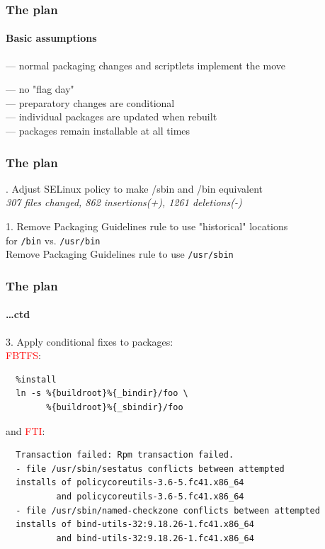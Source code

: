 \documentclass[]{beamer}
\begin{document}
\begin{frame}
  \frametitle{The plan}
  \framesubtitle{Basic assumptions}

  \pause
  — normal packaging changes and scriptlets implement the move
  \\\pause

  — no "flag day"
  \\\pause
  \phantom{—} — preparatory changes are conditional%
  \\\pause
  \phantom{—} — individual packages are updated when rebuilt
  \\\pause
  \phantom{—} — packages remain installable at all times
\end{frame}

\begin{frame}[fragile]
  \frametitle{The plan}

  . Adjust SELinux policy to make /sbin and /bin equivalent\\
  \textit{307 files changed, 862 insertions(+), 1261 deletions(-)}
  \\\pause

  1. Remove Packaging Guidelines rule to use "historical" locations\\
     \hspace*{5em} for \texttt{/bin} vs. \texttt{/usr/bin}\\
     Remove Packaging Guidelines rule to use \texttt{/usr/sbin}

  \hfill
\end{frame}

\begin{frame}[fragile]
  \frametitle{The plan}
  \framesubtitle{…ctd}

  3. Apply conditional fixes to packages:\\
  \textcolor{red}{FBTFS}:{\small
  \begin{verbatim}
  %install
  ln -s %{buildroot}%{_bindir}/foo \
        %{buildroot}%{_sbindir}/foo
  \end{verbatim}
  }
  and \textcolor{red}{FTI}:{\small
  \begin{verbatim}
  Transaction failed: Rpm transaction failed.
  - file /usr/sbin/sestatus conflicts between attempted
  installs of policycoreutils-3.6-5.fc41.x86_64
          and policycoreutils-3.6-5.fc41.x86_64
  - file /usr/sbin/named-checkzone conflicts between attempted
  installs of bind-utils-32:9.18.26-1.fc41.x86_64
          and bind-utils-32:9.18.26-1.fc41.x86_64
  \end{verbatim}
  }

  \hfill
\end{frame}
\end{document}
